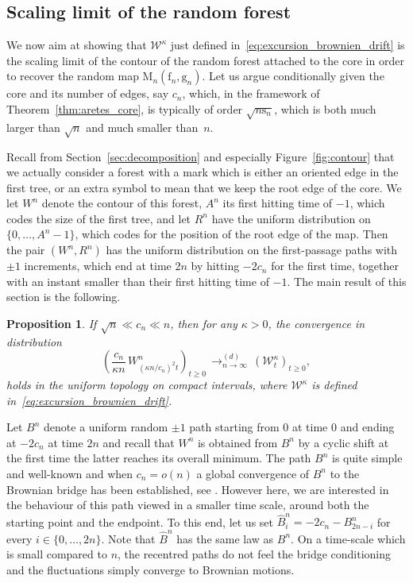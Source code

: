\documentclass[10pt]{amsart}
\theoremstyle{plain}
\newtheorem{proposition}[theorem]{Proposition}
\theoremstyle{definition}
\theoremstyle{remark}
\newcommand{\Map}{\mathrm{M}}
\newcommand{\face}{\mathrm{f}}
\newcommand{\gen}{\mathrm{g}}
\newcommand{\spar}{\mathrm{s}}
\newcommand{\cvloi}[1][n]{\,\mathop{\longrightarrow}^{(d)}_{#1 \to \infty}\,}
\begin{document}
\subsection{Scaling limit of the random forest}

We now aim at showing that $\mathcal{W}^\kappa$ just defined in~\eqref{eq:excursion_brownien_drift} is the scaling limit of the contour of the random forest attached to the core in order to recover the random map $\Map_n(\face_n, \gen_n)$.
Let us argue conditionally given the core and its number of edges, say $c_n$, which, in the framework of Theorem~\ref{thm:aretes_core}, is typically of order $\sqrt{n \spar_n}$, which is both much larger than $\sqrt{n}$ and much smaller than~$n$.

Recall from Section~\ref{sec:decomposition} and especially Figure~\ref{fig:contour} that we actually consider a forest with a mark which is either an oriented edge in the first tree, or an extra symbol to mean that we keep the root edge of the core. We let $W^n$ denote the contour of this forest, $A^n$ its first hitting time of $-1$, which codes the size of the first tree, and let $R^n$ have the uniform distribution on $\{0, \dots, A^n-1\}$, which codes for the position of the root edge of the map. Then the pair $(W^n, R^n)$ has the uniform distribution on the first-passage paths with $\pm1$ increments, which end at time $2n$ by hitting $-2c_n$ for the first time, together with an instant smaller than their first hitting time of $-1$.
The main result of this section is the following.

\begin{proposition}\label{prop:cv_contour_brownien_drift}
If $\sqrt{n} \ll c_n \ll n$, then for any $\kappa >0$, the convergence in distribution
\[
\left(\frac{c_{n}}{\kappa n}\, W^{n}_{(\kappa n/c_{n})^2 t}\right)_{t \ge 0}
\cvloi \left(\mathcal{W}^{\kappa}_{t}\right)_{t \ge 0},
\]
holds in the uniform topology on compact intervals, where $\mathcal{W}^\kappa$ is defined in~\eqref{eq:excursion_brownien_drift}.
\end{proposition}

Let $B^n$ denote a uniform random $\pm1$ path starting from $0$ at time $0$ and ending at $-2c_n$ at time $2n$ and recall that $W^n$ is obtained from $B^n$ by a cyclic shift at the first time the latter reaches its overall minimum.
The path $B^n$ is quite simple and well-known and when $c_n=o(n)$ a global convergence of $B^n$ to the Brownian bridge has been established, see \eg \cite[Th.\,20.7]{Ald85}.
However here, we are interested in the behaviour of this path viewed in a smaller time scale, around both the starting point and the endpoint. To this end, let us set $\widehat{B}^{n}_{i} = -2c_{n}-B^{n}_{2n-i}$ for every $i \in \{0, \dots, 2n\}$. Note that $\widehat{B}^{n}$ has the same law as $B^{n}$.
On a time-scale which is small compared to $n$, the recentred paths do not feel the bridge conditioning and the fluctuations simply converge to Brownian motions.
\end{document}
